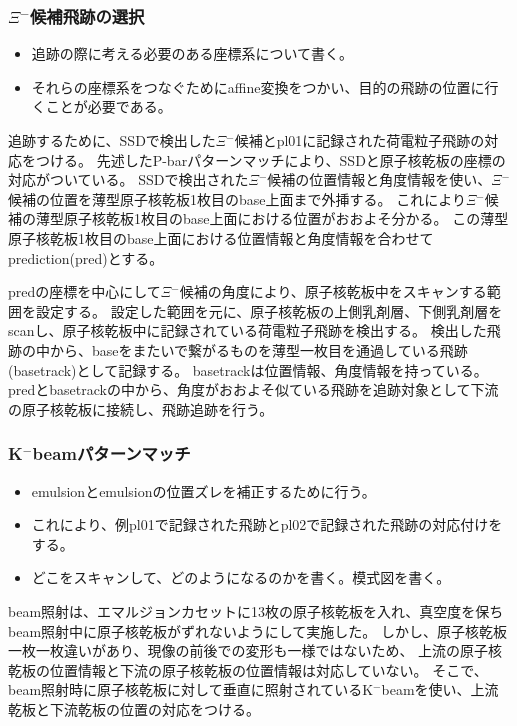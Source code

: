\documentclass[12pt,a4paper]{jarticle}
\begin{document}
\subsubsection{$\Xi$$^-$候補飛跡の選択}
\begin{itemize}
    \item 追跡の際に考える必要のある座標系について書く。
    \item それらの座標系をつなぐためにaffine変換をつかい、目的の飛跡の位置に行くことが必要である。
\end{itemize}
追跡するために、SSDで検出した$\Xi$$^-$候補とpl01に記録された荷電粒子飛跡の対応をつける。
先述したP-barパターンマッチにより、SSDと原子核乾板の座標の対応がついている。
SSDで検出された$\Xi$$^-$候補の位置情報と角度情報を使い、$\Xi$$^-$候補の位置を薄型原子核乾板1枚目のbase上面まで外挿する。
これにより$\Xi$$^-$候補の薄型原子核乾板1枚目のbase上面における位置がおおよそ分かる。
この薄型原子核乾板1枚目のbase上面における位置情報と角度情報を合わせてprediction(pred)とする。
\par
predの座標を中心にして$\Xi$$^-$候補の角度により、原子核乾板中をスキャンする範囲を設定する。
設定した範囲を元に、原子核乾板の上側乳剤層、下側乳剤層をscanし、原子核乾板中に記録されている荷電粒子飛跡を検出する。
検出した飛跡の中から、baseをまたいで繋がるものを薄型一枚目を通過している飛跡(basetrack)として記録する。
basetrackは位置情報、角度情報を持っている。
predとbasetrackの中から、角度がおおよそ似ている飛跡を追跡対象として下流の原子核乾板に接続し、飛跡追跡を行う。
\subsubsection{K$^-$beamパターンマッチ}
\begin{itemize}
    \item emulsionとemulsionの位置ズレを補正するために行う。
    \item これにより、例pl01で記録された飛跡とpl02で記録された飛跡の対応付けをする。
    \item どこをスキャンして、どのようになるのかを書く。模式図を書く。
\end{itemize}
beam照射は、エマルジョンカセットに13枚の原子核乾板を入れ、真空度を保ちbeam照射中に原子核乾板がずれないようにして実施した。
しかし、原子核乾板一枚一枚違いがあり、現像の前後での変形も一様ではないため、
上流の原子核乾板の位置情報と下流の原子核乾板の位置情報は対応していない。
そこで、beam照射時に原子核乾板に対して垂直に照射されているK$^-$beamを使い、上流乾板と下流乾板の位置の対応をつける。
\end{document}
